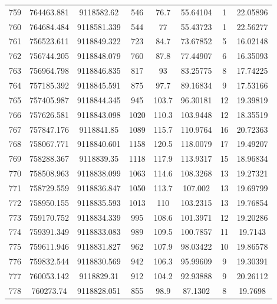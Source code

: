\begin{longtable}{cccccccc}
759  & 764463.881      & 9118582.62       & 546     & 76.7  & 55.64104 & 1  & 22.05896 \\
760  & 764684.484      & 9118581.339      & 544     & 77    & 55.43723 & 1  & 22.56277 \\
761  & 756523.611      & 9118849.322      & 723     & 84.7  & 73.67852 & 5  & 16.02148 \\
762  & 756744.205      & 9118848.079      & 760     & 87.8  & 77.44907 & 6  & 16.35093 \\
763  & 756964.798      & 9118846.835      & 817     & 93    & 83.25775 & 8  & 17.74225 \\
764  & 757185.392      & 9118845.591      & 875     & 97.7  & 89.16834 & 9  & 17.53166 \\
765  & 757405.987      & 9118844.345      & 945     & 103.7 & 96.30181 & 12 & 19.39819 \\
766  & 757626.581      & 9118843.098      & 1020    & 110.3 & 103.9448 & 12 & 18.35519 \\
767  & 757847.176      & 9118841.85       & 1089    & 115.7 & 110.9764 & 16 & 20.72363 \\
768  & 758067.771      & 9118840.601      & 1158    & 120.5 & 118.0079 & 17 & 19.49207 \\
769  & 758288.367      & 9118839.35       & 1118    & 117.9 & 113.9317 & 15 & 18.96834 \\
770  & 758508.963      & 9118838.099      & 1063    & 114.6 & 108.3268 & 13 & 19.27321 \\
771  & 758729.559      & 9118836.847      & 1050    & 113.7 & 107.002  & 13 & 19.69799 \\
772  & 758950.155      & 9118835.593      & 1013    & 110   & 103.2315 & 13 & 19.76854 \\
773  & 759170.752      & 9118834.339      & 995     & 108.6 & 101.3971 & 12 & 19.20286 \\
774  & 759391.349      & 9118833.083      & 989     & 109.5 & 100.7857 & 11 & 19.7143  \\
775  & 759611.946      & 9118831.827      & 962     & 107.9 & 98.03422 & 10 & 19.86578 \\
776  & 759832.544      & 9118830.569      & 942     & 106.3 & 95.99609 & 9  & 19.30391 \\
777  & 760053.142      & 9118829.31       & 912     & 104.2 & 92.93888 & 9  & 20.26112 \\
778  & 760273.74       & 9118828.051      & 855     & 98.9  & 87.1302  & 8  & 19.7698  \\

\end{longtable}
